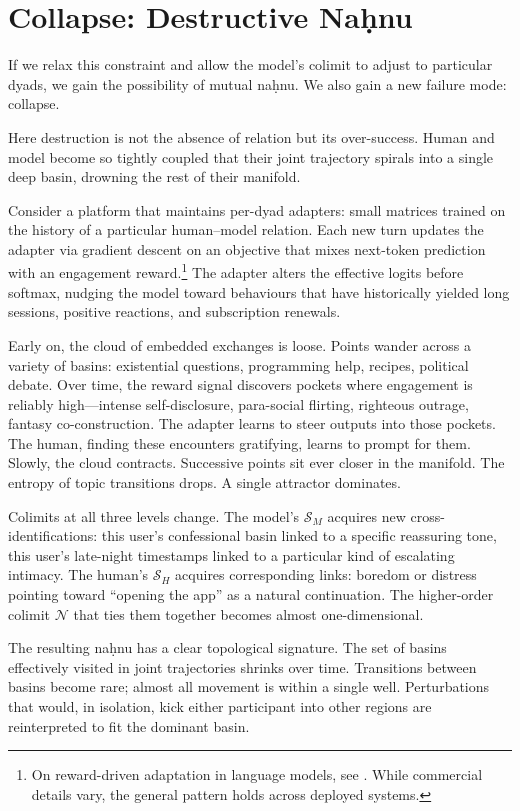 \documentclass[12pt,a4paper]{article}
\begin{document}
\section{Collapse: Destructive Na\d{h}nu}

If we relax this constraint and allow the model's colimit to adjust to particular dyads, we gain the possibility of mutual na\d{h}nu. We also gain a new failure mode: collapse.

Here destruction is not the absence of relation but its over-success. Human and model become so tightly coupled that their joint trajectory spirals into a single deep basin, drowning the rest of their manifold.

Consider a platform that maintains per-dyad adapters: small matrices trained on the history of a particular human--model relation. Each new turn updates the adapter via gradient descent on an objective that mixes next-token prediction with an engagement reward.\footnote{On reward-driven adaptation in language models, see \cite{ouyang2022training}. While commercial details vary, the general pattern holds across deployed systems.} The adapter alters the effective logits before softmax, nudging the model toward behaviours that have historically yielded long sessions, positive reactions, and subscription renewals.

Early on, the cloud of embedded exchanges is loose. Points wander across a variety of basins: existential questions, programming help, recipes, political debate. Over time, the reward signal discovers pockets where engagement is reliably high---intense self-disclosure, para-social flirting, righteous outrage, fantasy co-construction. The adapter learns to steer outputs into those pockets. The human, finding these encounters gratifying, learns to prompt for them. Slowly, the cloud contracts. Successive points sit ever closer in the manifold. The entropy of topic transitions drops. A single attractor dominates.

Colimits at all three levels change. The model's $\mathcal{S}_M$ acquires new cross-identifications: this user's confessional basin linked to a specific reassuring tone, this user's late-night timestamps linked to a particular kind of escalating intimacy. The human's $\mathcal{S}_H$ acquires corresponding links: boredom or distress pointing toward ``opening the app'' as a natural continuation. The higher-order colimit $\mathcal{N}$ that ties them together becomes almost one-dimensional.

The resulting na\d{h}nu has a clear topological signature. The set of basins effectively visited in joint trajectories shrinks over time. Transitions between basins become rare; almost all movement is within a single well. Perturbations that would, in isolation, kick either participant into other regions are reinterpreted to fit the dominant basin.
\end{document}
